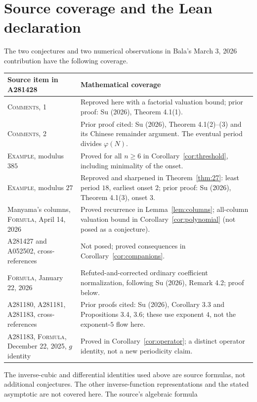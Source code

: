 \documentclass[11pt]{article}
\begin{document}
\section{Source coverage and the Lean declaration}\label{sec:coverage}
The two conjectures and two numerical observations in Bala's
March 3, 2026 contribution have the following coverage.
\begin{center}\small
\begin{tabularx}{\linewidth}{@{}p{.28\linewidth}X@{}}
\toprule
Source item in A281428 & Mathematical coverage\\
\midrule
\textsc{Comments}, 1 & Reproved here with a factorial valuation bound;
prior proof: Su (2026), Theorem 4.1(1).\\
\textsc{Comments}, 2 & Prior proof cited: Su (2026), Theorem 4.1(2)--(3)
and its Chinese remainder argument. The eventual period divides $\varphi(N)$.\\
\textsc{Example}, modulus $385$ & Proved for all $n\geq6$ in
Corollary~\ref{cor:threshold}, including minimality of the onset.\\
\textsc{Example}, modulus $27$ & Reproved and sharpened in
Theorem~\ref{thm:27}: least period $18$, earliest onset $2$;
prior proof: Su (2026), Theorem 4.1(3), onset $3$.\\
Manyama's columns, \textsc{Formula}, April 14, 2026 & Proved recurrence
in Lemma~\ref{lem:columns}; all-column valuation bound in
Corollary~\ref{cor:polynomial} (not posed as a conjecture).\\
A281427 and A052502, cross-references & Not posed; proved consequences
in Corollary~\ref{cor:companions}.\\
\textsc{Formula}, January 22, 2026 & Refuted-and-corrected ordinary
coefficient normalization, following Su (2026), Remark 4.2; proof below.\\
A281180, A281181, A281183, cross-references & Prior proofs cited:
Su (2026), Corollary 3.3 and Propositions 3.4, 3.6; these use exponent $4$,
not the exponent-$5$ flow here.\\
A281183, \textsc{Formula}, December 22, 2025, $g$ identity & Proved in
Corollary~\ref{cor:operator}; a distinct operator identity, not a new
periodicity claim.\\
\bottomrule
\end{tabularx}
\end{center}
The inverse-cubic and differential identities used above are source formulas,
not additional conjectures. The other inverse-function representations and
the stated asymptotic are not covered here. The source's algebraic formula
\end{document}
